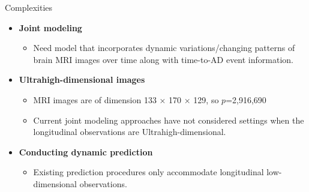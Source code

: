 \documentclass[
  ignorenonframetext,
]{beamer}
\providecommand{\tightlist}{%
  \setlength{\itemsep}{0pt}\setlength{\parskip}{0pt}}
\begin{document}
\begin{frame}{Complexities}
\protect\hypertarget{complexities}{}
\begin{itemize}
\tightlist
\item
  \textbf{Joint modeling}

  \begin{itemize}
  \tightlist
  \item
    Need model that incorporates dynamic variations/changing patterns of
    brain MRI images over time along with time-to-AD event information.
  \end{itemize}
\item
  \textbf{Ultrahigh-dimensional images}

  \begin{itemize}
  \tightlist
  \item
    MRI images are of dimension 133 × 170 × 129, so \(p\)=2,916,690
  \item
    Current joint modeling approaches have not considered settings when
    the longitudinal observations are Ultrahigh-dimensional.
  \end{itemize}
\item
  \textbf{Conducting dynamic prediction}

  \begin{itemize}
  \tightlist
  \item
    Existing prediction procedures only accommodate longitudinal
    low-dimensional observations.
  \end{itemize}
\end{itemize}
\end{frame}
\end{document}
